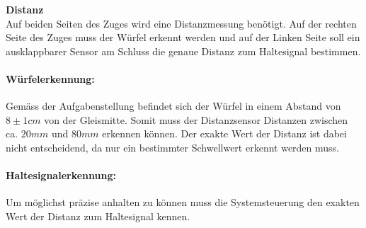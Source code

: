 \documentclass[../../main.tex]{subfiles}
\begin{document}
    \textbf{Distanz}\\
    Auf beiden Seiten des Zuges wird eine Distanzmessung benötigt. Auf der rechten Seite des Zuges muss der Würfel erkennt werden und auf der Linken Seite soll ein ausklappbarer Sensor am Schluss die genaue Distanz zum Haltesignal bestimmen.

    \paragraph{Würfelerkennung:}
    Gemäss der Aufgabenstellung befindet sich der Würfel in einem Abstand von $8\pm1cm$ von der Gleismitte. Somit muss der Distanzsensor Distanzen zwischen ca. $20mm$ und $80mm$ erkennen können. Der exakte Wert der Distanz ist dabei nicht entscheidend, da nur ein bestimmter Schwellwert erkennt werden muss.

    \paragraph{Haltesignalerkennung:}
    Um möglichst präzise anhalten zu können muss die Systemsteuerung den exakten Wert der Distanz zum Haltesignal kennen. 

    
\end{document}
